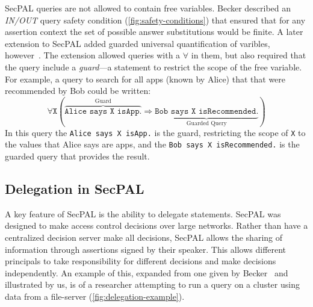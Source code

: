 \documentclass[thesis.tex]{subfiles}
\begin{document}
SecPAL queries are not allowed to contain free variables.
Becker described an \emph{IN/OUT} query safety condition (\autoref{fig:safety-conditions}) that ensured that for any assertion context the set of possible answer substitutions would be finite.
A later extension to SecPAL added guarded universal quantification of varibles, however~\cite{moritz_y_becker_secpal:_2009}. 
The extension allowed queries with a $\forall$ in them, but also required that the query include a \emph{guard}---a statement to restrict the scope of the free variable.
For example, a query to search for all apps (known by Alice) that that were recommended by Bob could be written:
\begin{equation*}
  \forall \mathtt{X}\left( \overbrace{\texttt{Alice says X isApp.}}^{\text{Guard}} \Rightarrow \underbrace{\texttt{Bob says X isRecommended.}}_{\text{Guarded Query}}\right)
\end{equation*}
In this query the \texttt{Alice says X isApp.} is the guard, restricting the scope of \texttt{X} to 
the values that Alice says are apps, and the \texttt{Bob says X isRecommended.} is the guarded query that provides the result.

\subsection{Delegation in SecPAL}
\label{ssec:delegation_in_secpal}

A key feature of SecPAL is the ability to delegate statements. SecPAL was
designed to make access control decisions over large networks. Rather than have
a centralized decision server make all decisions, SecPAL allows
the sharing of information through assertions signed by their speaker. This allows
different principals to take responsibility for different decisions and make
decisions independently. An example of this, expanded from one given by
Becker~\cite{becker_secpal:_2006} and illustrated by us, is of a
researcher attempting to run a query on a cluster using data from a file-server
(\autoref{fig:delegation-example}).
\end{document}
